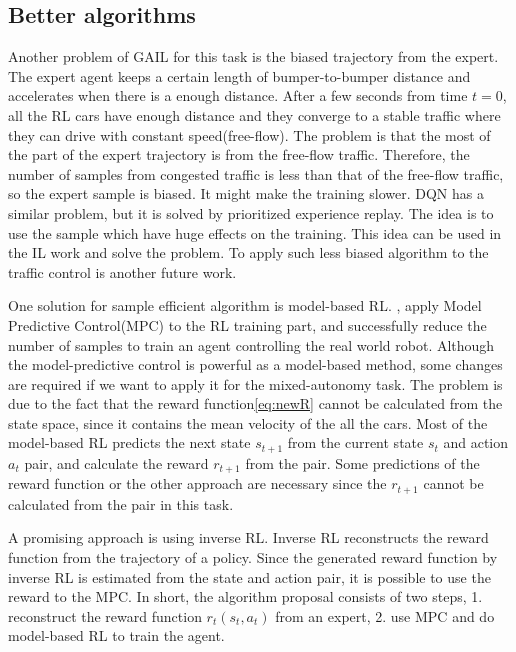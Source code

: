 \subsection{Better algorithms}
Another problem of GAIL for this task is the biased trajectory from the expert. The expert agent keeps a certain length of bumper-to-bumper distance and accelerates when there is a enough distance. After a few seconds from time $t=0$, all the RL cars have enough distance and they converge to a stable traffic where they can drive with constant speed(free-flow). The problem is that the most of the part of the expert trajectory is from the free-flow traffic. Therefore, the number of samples from congested traffic is less than that of the free-flow traffic, so the expert sample is biased. It might make the training slower. DQN\cite{Mnih2013} has a similar problem, but it is solved by prioritized experience replay\cite{Schaul2015}. The idea is to use the sample which have huge effects on the training. This idea can be used in the IL work and solve the problem. To apply such less biased algorithm to the traffic control is another future work.

One solution for sample efficient algorithm is model-based RL. \cite{Nagabandi2017}, \cite{Nagabandi} apply Model Predictive Control(MPC) to the RL training part, and successfully reduce the number of samples to train an agent controlling the real world robot. Although the model-predictive control is powerful as a model-based method, some changes are required if we want to apply it for the mixed-autonomy task. The problem is due to the fact that the reward function\ref{eq:newR} cannot be calculated from the state space, since it contains the mean velocity of the all the cars. Most of the model-based RL predicts the next state $s_{t+1}$ from the current state $s_t$ and action $a_t$ pair, and calculate the reward $r_{t+1}$ from the pair. Some predictions of the reward function or the other approach are necessary since the $r_{t+1}$ cannot be calculated from the pair in this task. 

A promising approach is using inverse RL\cite{Ng2000}. Inverse RL reconstructs the reward function from the trajectory of a policy. Since the generated reward function by inverse RL is estimated from the state and action pair, it is possible to use the reward to the MPC. In short, the algorithm proposal consists of two steps, 1. reconstruct the reward function $r_t(s_t, a_t)$ from an expert, 2. use MPC and do model-based RL to train the agent.